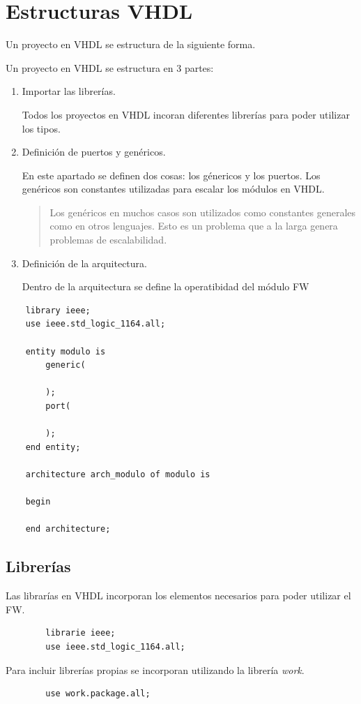 \section*{Estructuras VHDL}

Un proyecto en VHDL se estructura de la siguiente forma.

Un proyecto en VHDL se estructura en 3 partes: 
\begin{enumerate}
    \item Importar las librerías.
    
        Todos los proyectos en VHDL incoran diferentes librerías para poder
        utilizar los tipos.

    \item Definición de puertos y genéricos.
    
        En este apartado se definen dos cosas: los génericos y los puertos.
        Los genéricos son constantes utilizadas para escalar los módulos en VHDL.
        \begin{quotation}
            \noindent Los genéricos en muchos casos son utilizados como constantes generales como en 
            otros lenguajes.
            Esto es un problema que a la larga genera problemas de escalabilidad.
        \end{quotation}

    \item Definición de la arquitectura.
    
        Dentro de la arquitectura se define la operatibidad del módulo FW
    

\end{enumerate}



\begin{verbatim}
    library ieee;
    use ieee.std_logic_1164.all;

    entity modulo is
        generic(

        );
        port(

        );
    end entity;

    architecture arch_modulo of modulo is

    begin

    end architecture;
\end{verbatim}

\subsection{Librerías}
Las librarías en VHDL incorporan los elementos necesarios para poder utilizar el FW.
    \begin{verbatim}
        librarie ieee;
        use ieee.std_logic_1164.all;
    \end{verbatim}
Para incluir librerías propias se incorporan utilizando la librería \textit{work}.
    \begin{verbatim}
        use work.package.all;
    \end{verbatim}


